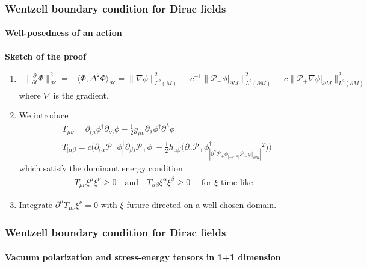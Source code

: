 \documentclass[french]{beamer}
\begin{document}
\begin{frame}[shrink=20]
\frametitle{Wentzell boundary condition for Dirac fields}
\framesubtitle{Well-posedness of an action}
\textbf{Sketch of the proof}

\begin{enumerate}
\item 
\begin{equation*}
\begin{split}
\big\| \frac{\partial }{\partial t} \Phi \big\|^2_\mathcal{H}   = &
\langle \Phi, \Delta^2 \Phi \rangle_{\mathcal{H}} = 
\|\nabla \phi \|^2_{L^2 (M)} + c^{-1} \| \mathcal{P}_- \phi\vert_{\partial M} \|^2_{L^2(\partial M)}
+ c \| \mathcal{P}_+ \nabla \phi\vert_{\partial M} \|^2_{L^2(\partial M)}
\end{split}
\end{equation*}
where $\nabla$ is the gradient.

\item We introduce 
\begin{equation*}
\begin{split}
& T_{\mu\nu} = \partial_{(\mu} \phi^\dagger \partial_{\nu)} \phi - \frac{1}{2}g_{\mu\nu} \partial_\lambda\phi^\dagger\partial^\lambda\phi  \\
& T_{|\alpha\beta} = c\Big( \partial_{(\alpha}\mathcal{P}_+\phi^\dagger_| \partial_{\beta)}\mathcal{P}_+\phi_| - 
\frac{1}{2}h_{\alpha\beta}\big( \partial_\gamma\mathcal{P}_+\phi^\dagger_| \partial^\gamma\mathcal{P}_+\phi_|
 - c^{-2}|\mathcal{P}_- \phi\vert_{\partial M}|^2 \big)\Big) 
\end{split}
\end{equation*}
which satisfy the dominant energy condition
\begin{equation*}
\begin{split}
T_{\mu\nu} \xi^\mu \xi^\nu \geq 0 \quad \mathrm{ and }\quad
T_{\alpha\beta} \xi^\alpha \xi^\beta \geq 0 
\quad\textrm{ for $\xi$ time-like}
\end{split}
\end{equation*}

\item Integrate $\partial^\mu T_{\mu\nu}\xi^\nu = 0$ with $\xi$ future directed on a well-chosen domain.

\end{enumerate}

\end{frame}
\begin{frame}
\frametitle{Wentzell boundary condition for Dirac fields}
\framesubtitle{Vacuum polarization and stress-energy tensors in 1+1 dimension}



\end{frame}
\end{document}
